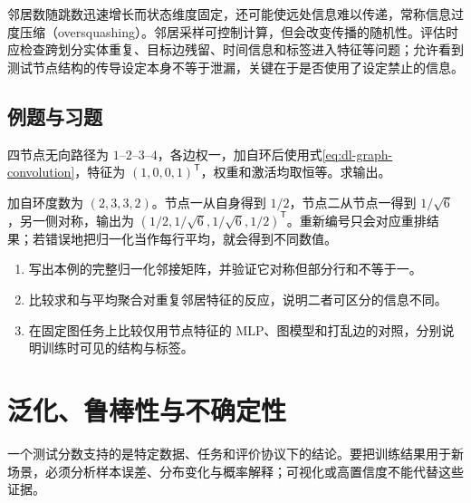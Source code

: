 \documentclass[UTF8,12pt,a4paper,fontset=fandol]{ctexbook}
\begin{document}
邻居数随跳数迅速增长而状态维度固定，还可能使远处信息难以传递，常称信息过度压缩（oversquashing）。邻居采样可控制计算，但会改变传播的随机性。评估时应检查跨划分实体重复、目标边残留、时间信息和标签进入特征等问题；允许看到测试节点结构的传导设定本身不等于泄漏，关键在于是否使用了设定禁止的信息。

\section{例题与习题}
\begin{example}[路径图的一层聚合]
四节点无向路径为 $1$--$2$--$3$--$4$，各边权一，加自环后使用式\eqref{eq:dl-graph-convolution}，特征为 $(1,0,0,1)^\mathsf T$，权重和激活均取恒等。求输出。
\end{example}
\begin{solve}
加自环度数为 $(2,3,3,2)$。节点一从自身得到 $1/2$，节点二从节点一得到 $1/\sqrt6$，另一侧对称，输出为 $(1/2,1/\sqrt6,1/\sqrt6,1/2)^\mathsf T$。重新编号只会对应重排结果；若错误地把归一化当作每行平均，就会得到不同数值。
\end{solve}
\begin{enumerate}
\item 写出本例的完整归一化邻接矩阵，并验证它对称但部分行和不等于一。
\item 比较求和与平均聚合对重复邻居特征的反应，说明二者可区分的信息不同。
\item 在固定图任务上比较仅用节点特征的 MLP、图模型和打乱边的对照，分别说明训练时可见的结构与标签。
\end{enumerate}

\chapter{泛化、鲁棒性与不确定性}
\label{chap:dl-reliability}
一个测试分数支持的是特定数据、任务和评价协议下的结论。要把训练结果用于新场景，必须分析样本误差、分布变化与概率解释；可视化或高置信度不能代替这些证据。
\end{document}

